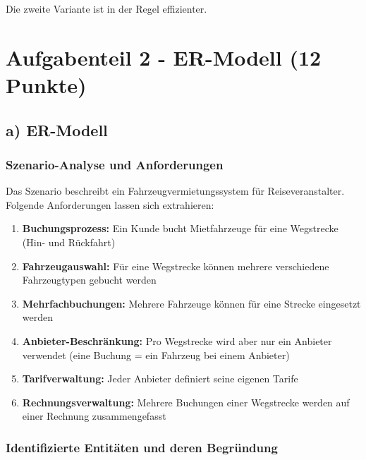 \documentclass[12pt,a4paper]{article}
\begin{document}
Die zweite Variante ist in der Regel effizienter.

\vspace{2cm}

\section*{Aufgabenteil 2 - ER-Modell (12 Punkte)}

\subsection*{a) ER-Modell}

\subsubsection*{Szenario-Analyse und Anforderungen}

Das Szenario beschreibt ein Fahrzeugvermietungssystem für Reiseveranstalter. Folgende Anforderungen lassen sich extrahieren:

\begin{enumerate}
    \item \textbf{Buchungsprozess:} Ein Kunde bucht Mietfahrzeuge für eine Wegstrecke (Hin- und Rückfahrt)
    \item \textbf{Fahrzeugauswahl:} Für eine Wegstrecke können mehrere verschiedene Fahrzeugtypen gebucht werden
    \item \textbf{Mehrfachbuchungen:} Mehrere Fahrzeuge können für eine Strecke eingesetzt werden
    \item \textbf{Anbieter-Beschränkung:} Pro Wegstrecke wird aber nur ein Anbieter verwendet (eine Buchung = ein Fahrzeug bei einem Anbieter)
    \item \textbf{Tarifverwaltung:} Jeder Anbieter definiert seine eigenen Tarife
    \item \textbf{Rechnungsverwaltung:} Mehrere Buchungen einer Wegstrecke werden auf einer Rechnung zusammengefasst
\end{enumerate}

\subsubsection*{Identifizierte Entitäten und deren Begründung}
\end{document}
